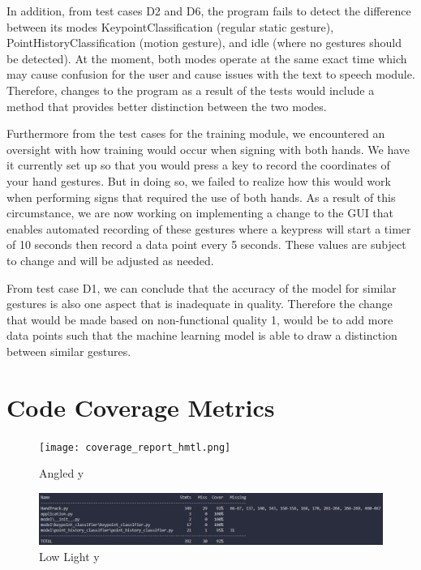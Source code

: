 \documentclass[12pt, titlepage]{article}
\begin{document}
In addition, from test cases D2 and D6, the program fails to detect the difference between its modes KeypointClassification 
(regular static gesture), PointHistoryClassification (motion gesture), and idle (where no gestures should be detected). At the 
moment, both modes operate at the same exact time which may cause confusion for the user and cause issues with the text to speech 
module. Therefore, changes to the program as a result of the tests would include a method that provides better distinction between 
the two modes.

Furthermore from the test cases for the training module, we encountered an oversight with how training would occur when signing with 
both hands. We have it currently set up so that you would press a key to record the coordinates of your hand gestures. But in doing so, 
we failed to realize how this would work when performing signs that required the use of both hands. As a result of this circumstance, we 
are now working on implementing a change to the GUI that enables automated recording of these gestures where a keypress will start a timer 
of 10 seconds then record a data point every 5 seconds. These values are subject to change and will be adjusted as needed.

From test case D1, we can conclude that the accuracy of the model for similar gestures is also one aspect that is inadequate in quality. 
Therefore the change that would be made based on non-functional quality 1, would be to add more data points such that the machine learning 
model is able to draw a distinction between similar gestures.

\section{Code Coverage Metrics}

\begin{figure}[h]
    \texttt{[image: coverage\_report\_hmtl.png]}
    \caption{Angled y}\label{fig:Coverage Report - HTML}
  \endminipage\hfill
    \includegraphics[width=\linewidth]{coverage_report_terminal.png}
    \caption{Low Light y}\label{fig:Coverage Report - Terminal}
  \endminipage\hfill
\end{figure}
\end{document}
